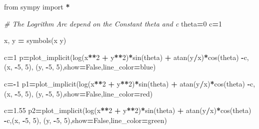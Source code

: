 \documentclass[
]{book}
\newenvironment{Shaded}{\begin{snugshade}}{\end{snugshade}}
\newcommand{\CommentTok}[1]{\textcolor[rgb]{0.56,0.35,0.01}{\textit{#1}}}
\newcommand{\DecValTok}[1]{\textcolor[rgb]{0.00,0.00,0.81}{#1}}
\newcommand{\FloatTok}[1]{\textcolor[rgb]{0.00,0.00,0.81}{#1}}
\newcommand{\ImportTok}[1]{#1}
\newcommand{\NormalTok}[1]{#1}
\newcommand{\OperatorTok}[1]{\textcolor[rgb]{0.81,0.36,0.00}{\textbf{#1}}}
\newcommand{\StringTok}[1]{\textcolor[rgb]{0.31,0.60,0.02}{#1}}
\newcommand{\VariableTok}[1]{\textcolor[rgb]{0.00,0.00,0.00}{#1}}
\theoremstyle{definition}
\theoremstyle{definition}
\theoremstyle{definition}
\theoremstyle{definition}
\theoremstyle{remark}
\begin{document}
\begin{Shaded}
\begin{Highlighting}[]
\ImportTok{from}\NormalTok{ sympy }\ImportTok{import} \OperatorTok{*}

\CommentTok{\# The Logrithm Arc depend on the Constant theta and c}
\NormalTok{theta}\OperatorTok{=}\DecValTok{0}
\NormalTok{c}\OperatorTok{=}\DecValTok{1}

\NormalTok{x, y }\OperatorTok{=}\NormalTok{ symbols(}\StringTok{\textquotesingle{}x y\textquotesingle{}}\NormalTok{)}

\NormalTok{c}\OperatorTok{=}\DecValTok{1}
\NormalTok{p}\OperatorTok{=}\NormalTok{plot\_implicit(log(x}\OperatorTok{**}\DecValTok{2} \OperatorTok{+}\NormalTok{ y}\OperatorTok{**}\DecValTok{2}\NormalTok{)}\OperatorTok{*}\NormalTok{sin(theta) }\OperatorTok{+}\NormalTok{ atan(y}\OperatorTok{/}\NormalTok{x)}\OperatorTok{*}\NormalTok{cos(theta) }\OperatorTok{{-}}\NormalTok{c,(x, }\OperatorTok{{-}}\DecValTok{5}\NormalTok{, }\DecValTok{5}\NormalTok{), (y, }\OperatorTok{{-}}\DecValTok{5}\NormalTok{, }\DecValTok{5}\NormalTok{),show}\OperatorTok{=}\VariableTok{False}\NormalTok{,line\_color}\OperatorTok{=}\StringTok{\textquotesingle{}blue\textquotesingle{}}\NormalTok{)}

\NormalTok{c}\OperatorTok{={-}}\DecValTok{1}
\NormalTok{p1}\OperatorTok{=}\NormalTok{plot\_implicit(log(x}\OperatorTok{**}\DecValTok{2} \OperatorTok{+}\NormalTok{ y}\OperatorTok{**}\DecValTok{2}\NormalTok{)}\OperatorTok{*}\NormalTok{sin(theta) }\OperatorTok{+}\NormalTok{ atan(y}\OperatorTok{/}\NormalTok{x)}\OperatorTok{*}\NormalTok{cos(theta) }\OperatorTok{{-}}\NormalTok{c,(x, }\OperatorTok{{-}}\DecValTok{5}\NormalTok{, }\DecValTok{5}\NormalTok{), (y, }\OperatorTok{{-}}\DecValTok{5}\NormalTok{, }\DecValTok{5}\NormalTok{),show}\OperatorTok{=}\VariableTok{False}\NormalTok{,line\_color}\OperatorTok{=}\StringTok{\textquotesingle{}red\textquotesingle{}}\NormalTok{)}

\NormalTok{c}\OperatorTok{=}\FloatTok{1.55}
\NormalTok{p2}\OperatorTok{=}\NormalTok{plot\_implicit(log(x}\OperatorTok{**}\DecValTok{2} \OperatorTok{+}\NormalTok{ y}\OperatorTok{**}\DecValTok{2}\NormalTok{)}\OperatorTok{*}\NormalTok{sin(theta) }\OperatorTok{+}\NormalTok{ atan(y}\OperatorTok{/}\NormalTok{x)}\OperatorTok{*}\NormalTok{cos(theta) }\OperatorTok{{-}}\NormalTok{c,(x, }\OperatorTok{{-}}\DecValTok{5}\NormalTok{, }\DecValTok{5}\NormalTok{), (y, }\OperatorTok{{-}}\DecValTok{5}\NormalTok{, }\DecValTok{5}\NormalTok{),show}\OperatorTok{=}\VariableTok{False}\NormalTok{,line\_color}\OperatorTok{=}\StringTok{\textquotesingle{}green\textquotesingle{}}\NormalTok{)}


\end{Highlighting}
\end{Shaded}
\end{document}
